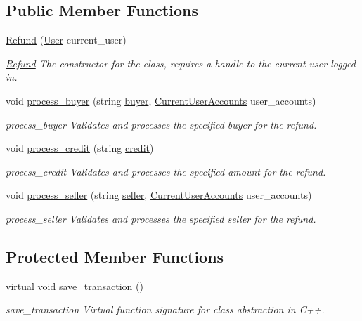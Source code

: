 \subsection*{Public Member Functions}
\begin{DoxyCompactItemize}
\item 
\hyperlink{class_refund_a0eb505b9541ed2a73cdbe5b56555394e}{Refund} (\hyperlink{class_user}{User} current\-\_\-user)
\begin{DoxyCompactList}\small\item\em \hyperlink{class_refund}{Refund} The constructor for the class, requires a handle to the current user logged in. \end{DoxyCompactList}\item 
void \hyperlink{class_refund_a90ef039ccc4d01ff299ddaef920da75c}{process\-\_\-buyer} (string \hyperlink{class_refund_a6b1f8b7205b4bb4f3dfa0cba13c39bac}{buyer}, \hyperlink{class_current_user_accounts}{Current\-User\-Accounts} user\-\_\-accounts)
\begin{DoxyCompactList}\small\item\em process\-\_\-buyer Validates and processes the specified buyer for the refund. \end{DoxyCompactList}\item 
void \hyperlink{class_refund_a50d6983ac76a6d99fd57444be9732322}{process\-\_\-credit} (string \hyperlink{class_refund_aa559c3686bb9d38c3335c16bbea07be8}{credit})
\begin{DoxyCompactList}\small\item\em process\-\_\-credit Validates and processes the specified amount for the refund. \end{DoxyCompactList}\item 
void \hyperlink{class_refund_a16c95fcef98ca691f9799852478a926d}{process\-\_\-seller} (string \hyperlink{class_refund_a8cdc0977faad029fbb45ab09035319b9}{seller}, \hyperlink{class_current_user_accounts}{Current\-User\-Accounts} user\-\_\-accounts)
\begin{DoxyCompactList}\small\item\em process\-\_\-seller Validates and processes the specified seller for the refund. \end{DoxyCompactList}\end{DoxyCompactItemize}
\subsection*{Protected Member Functions}
\begin{DoxyCompactItemize}
\item 
virtual void \hyperlink{class_refund_a8e5996ad33eb07eef44f55deba6c298e}{save\-\_\-transaction} ()
\begin{DoxyCompactList}\small\item\em save\-\_\-transaction Virtual function signature for class abstraction in C++. \end{DoxyCompactList}\end{DoxyCompactItemize}

